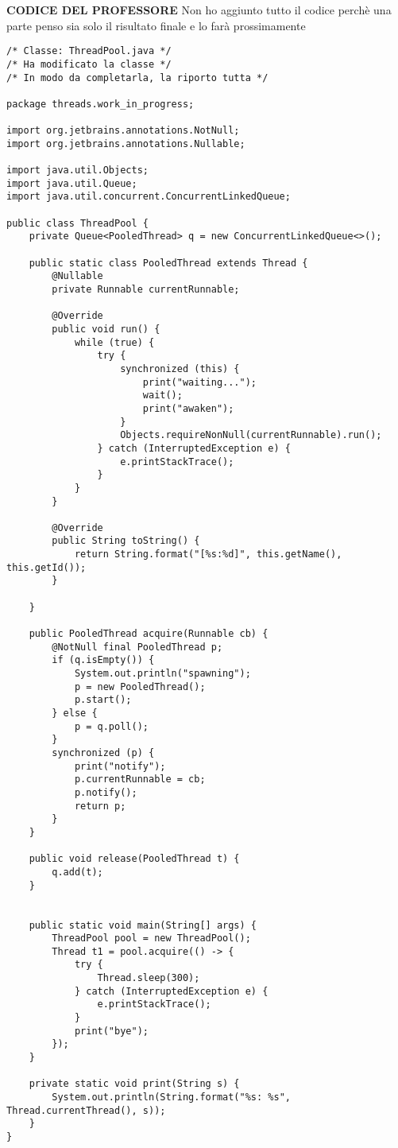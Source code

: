 \noindent \textbf{CODICE DEL PROFESSORE} \newline
\noindent Non ho aggiunto tutto il codice perchè una parte penso sia solo il risultato finale e lo farà prossimamente
\begin{lstlisting}[basicstyle=\small,]
/* Classe: ThreadPool.java */
/* Ha modificato la classe */
/* In modo da completarla, la riporto tutta */

package threads.work_in_progress;

import org.jetbrains.annotations.NotNull;
import org.jetbrains.annotations.Nullable;

import java.util.Objects;
import java.util.Queue;
import java.util.concurrent.ConcurrentLinkedQueue;

public class ThreadPool {
    private Queue<PooledThread> q = new ConcurrentLinkedQueue<>();

    public static class PooledThread extends Thread {
        @Nullable
        private Runnable currentRunnable;

        @Override
        public void run() {
            while (true) {
                try {
                    synchronized (this) {
                        print("waiting...");
                        wait();
                        print("awaken");
                    }
                    Objects.requireNonNull(currentRunnable).run();
                } catch (InterruptedException e) {
                    e.printStackTrace();
                }
            }
        }

        @Override
        public String toString() {
            return String.format("[%s:%d]", this.getName(), this.getId());
        }

    }

    public PooledThread acquire(Runnable cb) {
        @NotNull final PooledThread p;
        if (q.isEmpty()) {
            System.out.println("spawning");
            p = new PooledThread();
            p.start();
        } else {
            p = q.poll();
        }
        synchronized (p) {
            print("notify");
            p.currentRunnable = cb;
            p.notify();
            return p;
        }
    }

    public void release(PooledThread t) {
        q.add(t);
    }


    public static void main(String[] args) {
        ThreadPool pool = new ThreadPool();
        Thread t1 = pool.acquire(() -> {
            try {
                Thread.sleep(300);
            } catch (InterruptedException e) {
                e.printStackTrace();
            }
            print("bye");
        });
    }

    private static void print(String s) {
        System.out.println(String.format("%s: %s", Thread.currentThread(), s));
    }
}

\end{lstlisting}
 


